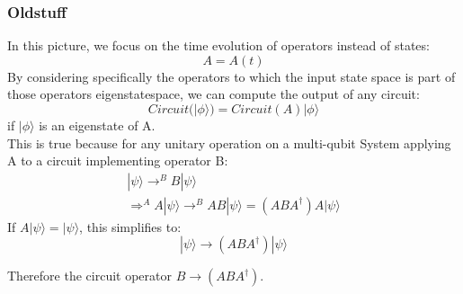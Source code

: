 \subsubsection{Oldstuff}

In this picture, we focus on the time evolution of operators instead
of states:
\begin{equation}
	A = A(t)
\end{equation}
By considering specifically the operators to which the input state
space is part of those operators eigenstatespace, we can compute
the output of any circuit:
\begin{equation}
	Circuit(|\phi\rangle) = Circuit(A)|\phi\rangle
\end{equation}
if $|\phi\rangle$ is an eigenstate of A.\\
This is true because for any unitary operation on a multi-qubit
System applying A to a circuit implementing operator B:
\begin{align}
	|\psi\rangle \rightarrow^{B} B|\psi\rangle \\
	\Rightarrow^A A|\psi\rangle \rightarrow^{B} AB|\psi\rangle =
	(ABA^{\dagger})A |\psi\rangle
\end{align}
If $A|\psi\rangle = |\psi\rangle$, this simplifies to:
\begin{equation}
	|\psi\rangle \rightarrow (ABA^{\dagger})|\psi\rangle
\end{equation}

Therefore the circuit operator $B\rightarrow (ABA^{\dagger})$. 

